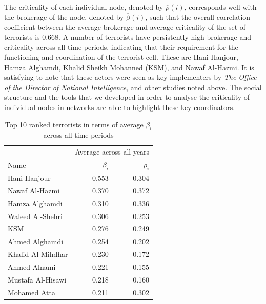The criticality of each individual node, denoted by $\overline{\rho}(i)$, corresponds well with the brokerage of the node, denoted by $\overline{\beta}(i)$, such that the overall correlation coefficient between the average brokerage and average criticality of the set of terrorists is 0.668. A number of terrorists have persistently high brokerage and criticality across all time periods, indicating that their requirement for the functioning and coordination of the terrorist cell. These are Hani Hanjour, Hamza Alghamdi, Khalid Sheikh Mohanned (KSM), and Nawaf Al-Hazmi. It is satisfying to note that these actors were seen as key implementers by \emph{The Office of the Director of National Intelligence}, and other studies noted above. The social structure and the tools that we developed in order to analyse the criticality of individual nodes in networks are able to highlight these key coordinators.

\begin{table}[t]
\begin{center}
\begin{tabular}{lrr}
\toprule
 & \multicolumn{2}{c}{Average across all years} \\[1ex]
Name 			   & $\overline{\beta}_{i}$ 	& $\overline{\rho}_{i}$	\\
\midrule
Hani Hanjour        & 0.553   & 0.304   \\
Nawaf Al-Hazmi      & 0.370   & 0.372   \\
Hamza Alghamdi      & 0.310   & 0.336   \\
Waleed Al-Shehri    & 0.306   & 0.253   \\
KSM                 & 0.276   & 0.249   \\
Ahmed Alghamdi      & 0.254   & 0.202   \\
Khalid Al-Mihdhar   & 0.230   & 0.172   \\
Ahmed Alnami        & 0.221   & 0.155   \\
Mustafa Al-Hisawi   & 0.218   & 0.160   \\
Mohamed Atta        & 0.211   & 0.302   \\
\bottomrule
\end{tabular}
\end{center}
\caption{Top 10 ranked terrorists in terms of average $\overline{\beta}_{i}$ across all time periods}
\label{criticalterrorists}
\end{table}

